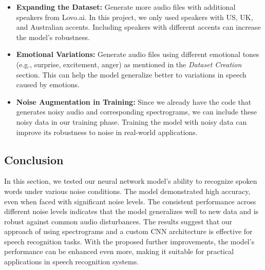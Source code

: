 \documentclass[12pt]{article}
\begin{document}
\begin{itemize}
    \item \textbf{Expanding the Dataset:} Generate more audio files with additional speakers from Lovo.ai. In this project, we only used speakers with US, UK, and Australian accents. Including speakers with different accents can increase the model's robustness.

    \item \textbf{Emotional Variations:} Generate audio files using different emotional tones (e.g., surprise, excitement, anger) as mentioned in the \textit{Dataset Creation} section. This can help the model generalize better to variations in speech caused by emotions.

    \item \textbf{Noise Augmentation in Training:} Since we already have the code that generates noisy audio and corresponding spectrograms, we can include these noisy data in our training phase. Training the model with noisy data can improve its robustness to noise in real-world applications.
\end{itemize}

\subsection{Conclusion}

In this section, we tested our neural network model's ability to recognize spoken words under various noise conditions. The model demonstrated high accuracy, even when faced with significant noise levels. The consistent performance across different noise levels indicates that the model generalizes well to new data and is robust against common audio disturbances. The results suggest that our approach of using spectrograms and a custom CNN architecture is effective for speech recognition tasks. With the proposed further improvements, the model's performance can be enhanced even more, making it suitable for practical applications in speech recognition systems.

\end{document}
